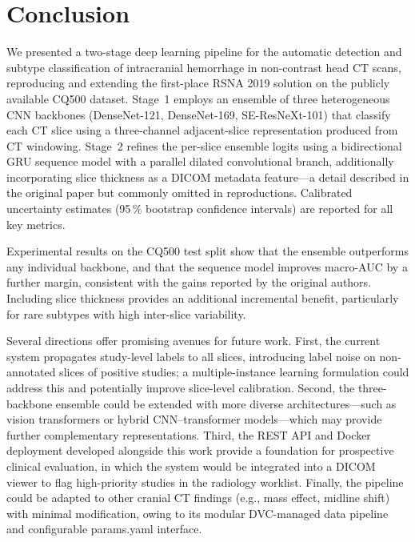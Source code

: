 \section{Conclusion}
\label{sec:conclusion}

We presented a two-stage deep learning pipeline for the automatic detection
and subtype classification of intracranial hemorrhage in non-contrast head
CT scans, reproducing and extending the first-place RSNA 2019 solution on
the publicly available CQ500 dataset.
Stage~1 employs an ensemble of three heterogeneous CNN backbones
(DenseNet-121, DenseNet-169, SE-ResNeXt-101) that classify each CT slice
using a three-channel adjacent-slice representation produced from CT
windowing.
Stage~2 refines the per-slice ensemble logits using a bidirectional GRU
sequence model with a parallel dilated convolutional branch, additionally
incorporating slice thickness as a DICOM metadata feature---a detail
described in the original paper but commonly omitted in reproductions.
Calibrated uncertainty estimates (95\,\% bootstrap confidence intervals)
are reported for all key metrics.

Experimental results on the CQ500 test split show that the ensemble
outperforms any individual backbone, and that the sequence model improves
macro-AUC by a further margin, consistent with the gains reported by the
original authors.
Including slice thickness provides an additional incremental benefit,
particularly for rare subtypes with high inter-slice variability.

Several directions offer promising avenues for future work.
First, the current system propagates study-level labels to all slices,
introducing label noise on non-annotated slices of positive studies;
a multiple-instance learning formulation could address this and potentially
improve slice-level calibration.
Second, the three-backbone ensemble could be extended with more diverse
architectures---such as vision transformers or hybrid CNN–transformer
models---which may provide further complementary representations.
Third, the REST API and Docker deployment developed alongside this work
provide a foundation for prospective clinical evaluation, in which the
system would be integrated into a DICOM viewer to flag high-priority studies
in the radiology worklist.
Finally, the pipeline could be adapted to other cranial CT findings (e.g.,
mass effect, midline shift) with minimal modification, owing to its modular
DVC-managed data pipeline and configurable params.yaml interface.
